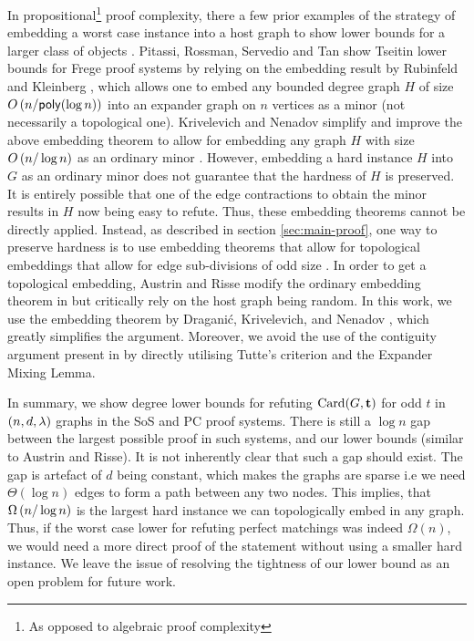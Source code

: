 \documentclass[11pt]{article}
\begin{document}
In propositional\footnote{As opposed to algebraic proof complexity} proof complexity, there a few prior examples of the strategy of embedding a worst case instance into a host graph to show lower bounds for a larger class of objects \cite{itsykson2021Near, pitassi2016PolyLogFrege}.
Pitassi, Rossman, Servedio and Tan show Tseitin lower bounds for Frege proof systems \citep{pitassi2016PolyLogFrege} by relying on the embedding result by Rubinfeld and Kleinberg \citep{kleinberg1996short}, which allows one to embed any bounded degree graph $H$ of size $O\left(n/\mathsf{poly}(\log n)\right)$ into an expander graph on $n$ vertices as a minor (not necessarily a topological one). 
Krivelevich and Nenadov simplify and improve the above embedding theorem to allow for embedding any graph $H$ with size $O\left(n/\log n\right)$ as an ordinary minor \citep{krivelevich2021completeMinors}.
However, embedding a hard instance $H$ into $G$ as an ordinary minor does not guarantee that the hardness of $H$ is preserved.
It is entirely possible that one of the edge contractions to obtain the minor results in $H$ now being easy to refute.
Thus, these embedding theorems cannot be directly applied.
Instead, as described in section \ref{sec:main-proof}, one way to preserve hardness is to use  embedding theorems that allow for topological embeddings that allow for edge sub-divisions of odd size \citep{draganic22rolling, nenadov2023routing}.
In order to get a topological embedding, Austrin and Risse modify the ordinary embedding theorem in \citep{krivelevich2021completeMinors} but critically rely on the host graph being random.
In this work, we use the embedding theorem by Dragani\'c, Krivelevich, and Nenadov \cite{draganic22rolling}, which greatly simplifies the argument. Moreover, we avoid the use of the contiguity argument present in \cite{Austrin_2022} by directly utilising Tutte's criterion and the Expander Mixing Lemma.

\par
In summary, we show degree lower bounds for refuting $\text{Card}(G, \mathbf{t})$ for odd $t$ in $(n, d, \lambda)$ graphs in the SoS and PC proof systems.
There is still a $\log n$ gap between the largest possible proof in such systems, and our lower bounds (similar to Austrin and Risse).
It is not inherently clear that such a gap should exist.
The gap is artefact of $d$ being constant, which makes the graphs are sparse i.e we need $\Theta(\log n)$ edges to form a path between any two nodes.
This implies, that $\Omega\left(n/\log n\right)$ is the largest hard instance we can topologically embed in any graph.
Thus, if the worst case lower for refuting perfect matchings was indeed $\Omega(n)$, we would need a more direct proof of the statement without using a smaller hard instance.
We leave the issue of resolving the tightness of our lower bound as an open problem for future work.




\clearpage
\appendix
\end{document}
